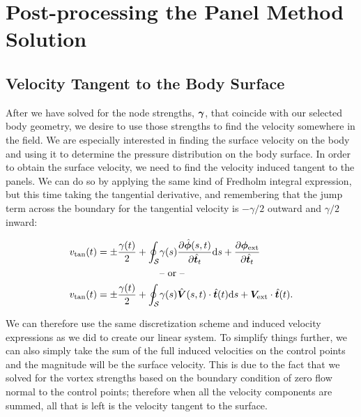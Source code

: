 \section{Post-processing the Panel Method Solution}

\subsection{Velocity Tangent to the Body Surface}
\label{sssec:vtanbody}

After we have solved for the node strengths, \(\bm{\gamma}\), that coincide with our selected body geometry, we desire to use those strengths to find the velocity somewhere in the field.
%
We are especially interested in finding the surface velocity on the body and using it to determine the pressure distribution on the body surface.
%
In order to obtain the surface velocity, we need to find the velocity induced tangent to the panels.
%
We can do so by applying the same kind of Fredholm integral expression, but this time taking the tangential derivative, and remembering that the jump term across the boundary for the tangential velocity is \(-\gamma/2\) outward and \(\gamma/2\) inward:

\begin{subequations}
    \label{eqn:fredholmtan}
    \begin{align}
        v_\text{tan}(t) = \pm \frac{\gamma(t)}{2} + \oint_\mathcal{S}& \gamma(s) \frac{\partial \hat{\bm{\phi}}(s,t)}{\partial \hat{\bm{t}}_t} \mathrm{d} s  +\frac{\partial \bm{\phi}_\text{ext}}{\partial \hat{\bm{t}}_t} \\
                                               & \text{-- or --} \notag\\
        v_\text{tan}(t) = \pm \frac{\gamma(t)}{2} + \oint_\mathcal{S} &\gamma(s) \hat{\bm{V}}(s,t)\cdot\hat{\bm{t}}(t) \mathrm{d} s + \bm{V}_\text{ext}\cdot\hat{\bm{t}}(t).
   \end{align}
\end{subequations}

We can therefore use the same discretization scheme and induced velocity expressions as we did to create our linear system.
%
To simplify things further, we can also simply take the sum of the full induced velocities on the control points and the magnitude will be the surface velocity.
%
This is due to the fact that we solved for the vortex strengths based on the boundary condition of zero flow normal to the control points; therefore when all the velocity components are summed, all that is left is the velocity tangent to the surface.

